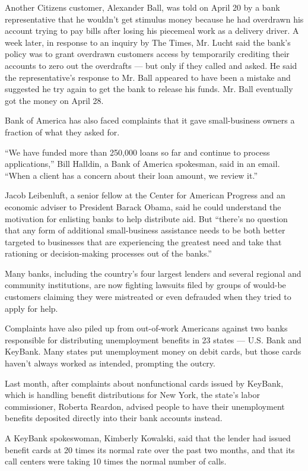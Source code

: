 Another Citizens customer, Alexander Ball, was told on April 20 by a
bank representative that he wouldn't get stimulus money because he had
overdrawn his account trying to pay bills after losing his piecemeal
work as a delivery driver. A week later, in response to an inquiry by
The Times, Mr. Lucht said the bank's policy was to grant overdrawn
customers access by temporarily crediting their accounts to zero out the
overdrafts --- but only if they called and asked. He said the
representative's response to Mr. Ball appeared to have been a mistake
and suggested he try again to get the bank to release his funds. Mr.
Ball eventually got the money on April 28.

Bank of America has also faced complaints that it gave small-business
owners a fraction of what they asked for.

``We have funded more than 250,000 loans so far and continue to process
applications,'' Bill Halldin, a Bank of America spokesman, said in an
email. ``When a client has a concern about their loan amount, we review
it.''

Jacob Leibenluft, a senior fellow at the Center for American Progress
and an economic adviser to President Barack Obama, said he could
understand the motivation for enlisting banks to help distribute aid.
But ``there's no question that any form of additional small-business
assistance needs to be both better targeted to businesses that are
experiencing the greatest need and take that rationing or
decision-making processes out of the banks.''

Many banks, including the country's four largest lenders and several
regional and community institutions, are now fighting lawsuits filed by
groups of would-be customers claiming they were mistreated or even
defrauded when they tried to apply for help.

Complaints have also piled up from out-of-work Americans against two
banks responsible for distributing unemployment benefits in 23 states
--- U.S. Bank and KeyBank. Many states put unemployment money on debit
cards, but those cards haven't always worked as intended, prompting the
outcry.

Last month, after complaints about nonfunctional cards issued by
KeyBank, which is handling benefit distributions for New York, the
state's labor commissioner, Roberta Reardon, advised people to have
their unemployment benefits deposited directly into their bank accounts
instead.

A KeyBank spokeswoman, Kimberly Kowalski, said that the lender had
issued benefit cards at 20 times its normal rate over the past two
months, and that its call centers were taking 10 times the normal number
of calls.

